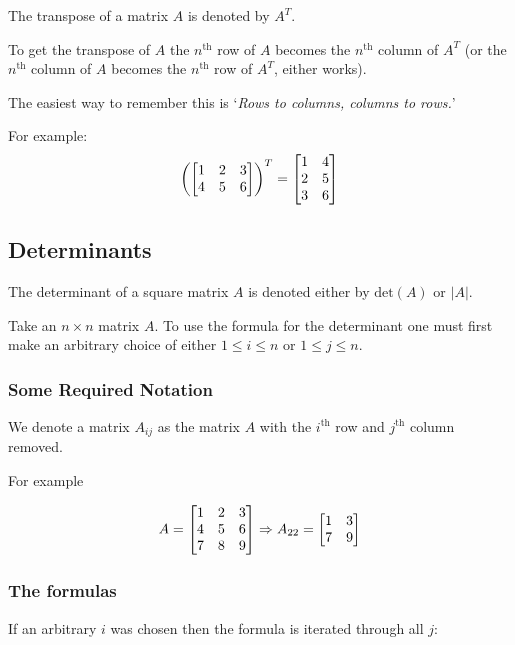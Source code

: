 \documentclass[main.tex]{subfiles}
\begin{document}
                    The transpose of a matrix $A$ is denoted by $A^T$.

                    To get the transpose of $A$ the $n^{\text{th}}$ row of $A$ becomes the $n^{\text{th}}$ column of $A^T$ (or the $n^{\text{th}}$ column of $A$ becomes the $n^{\text{th}}$ row of $A^T$, either works).

                    The easiest way to remember this is `\textit{Rows to columns, columns to rows.}'
                    
                    For example:
                    \begin{equation*}
                        \left(\begin{bmatrix} 1 & 2 & 3\\ 4 & 5 & 6 \end{bmatrix}\right)^T = \begin{bmatrix} 1 & 4\\ 2& 5\\ 3 & 6 \end{bmatrix}
                    \end{equation*}

                \subsection{Determinants}

                    The determinant of a square matrix $A$ is denoted either by $\text{det}(A)$ or $|A|$.

                    Take an $n \times n$ matrix $A$. To use the formula for the determinant one must first make an arbitrary choice of either $1 \leq i \leq n$ or $1 \leq j \leq n$.

                    \subsubsection{Some Required Notation}
                    We denote a matrix $A_{ij}$ as the matrix $A$ with the $i^{\text{th}}$ row and $j^{\text{th}}$ column removed.

                    For example

                    \begin{equation*}
                        A = \begin{bmatrix} 1 & 2 & 3\\4 & 5 & 6\\7 & 8 & 9 \end{bmatrix} \Rightarrow A_{22} = \begin{bmatrix} 1 & 3\\7 & 9 \end{bmatrix}
                    \end{equation*}

                    \subsubsection{The formulas}
                    If an arbitrary $i$ was chosen then the formula is iterated through all $j$:
\end{document}
